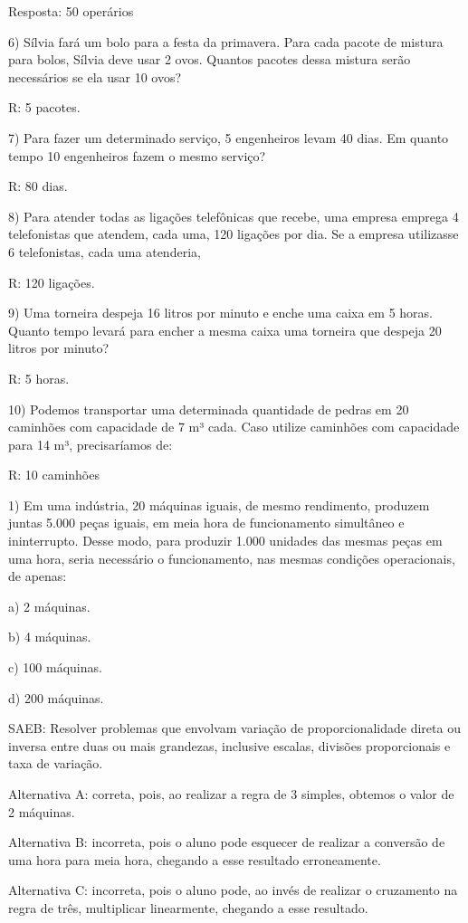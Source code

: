 Resposta: 50 operários

6) Sílvia fará um bolo para a festa da primavera. Para cada pacote de
mistura para bolos, Sílvia deve usar 2 ovos. Quantos pacotes dessa
mistura serão necessários se ela usar 10 ovos?

R: 5 pacotes.

7) Para fazer um determinado serviço, 5 engenheiros levam 40 dias. Em
quanto tempo 10 engenheiros fazem o mesmo serviço?

R: 80 dias.

8) Para atender todas as ligações telefônicas que recebe, uma empresa
emprega 4 telefonistas que atendem, cada uma, 120 ligações por dia. Se a
empresa utilizasse 6 telefonistas, cada uma atenderia,

R: 120 ligações.

9) Uma torneira despeja 16 litros por minuto e enche uma caixa em 5
horas. Quanto tempo levará para encher a mesma caixa uma torneira que
despeja 20 litros por minuto?

R: 5 horas.

10) Podemos transportar uma determinada quantidade de pedras em 20
caminhões com capacidade de 7 m³ cada. Caso utilize caminhões com
capacidade para 14 m³, precisaríamos de:

R: 10 caminhões


1) Em uma indústria, 20 máquinas iguais, de mesmo rendimento, produzem
juntas 5.000 peças iguais, em meia hora de funcionamento simultâneo e
ininterrupto. Desse modo, para produzir 1.000 unidades das mesmas peças
em uma hora, seria necessário o funcionamento, nas mesmas condições
operacionais, de apenas:

a) 2 máquinas.

b) 4 máquinas.

c) 100 máquinas.

d) 200 máquinas.

SAEB: Resolver problemas que envolvam variação de proporcionalidade
direta ou inversa entre duas ou mais grandezas, inclusive escalas,
divisões proporcionais e taxa de variação.

Alternativa A: correta, pois, ao realizar a regra de 3 simples, obtemos
o valor de 2 máquinas.

Alternativa B: incorreta, pois o aluno pode esquecer de realizar a
conversão de uma hora para meia hora, chegando a esse resultado
erroneamente.

Alternativa C: incorreta, pois o aluno pode, ao invés de realizar o
cruzamento na regra de três, multiplicar linearmente, chegando a esse
resultado.

